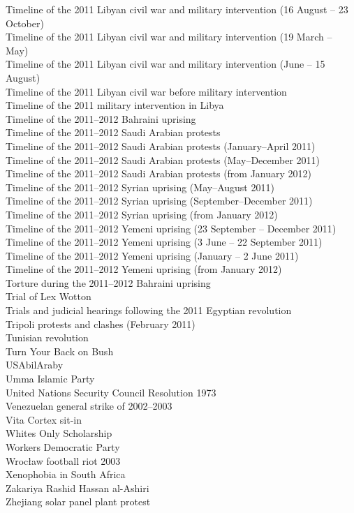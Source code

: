 Timeline of the 2011 Libyan civil war and military intervention (16 August – 23 October)\\
Timeline of the 2011 Libyan civil war and military intervention (19 March – May)\\
Timeline of the 2011 Libyan civil war and military intervention (June – 15 August)\\
Timeline of the 2011 Libyan civil war before military intervention\\
Timeline of the 2011 military intervention in Libya\\
Timeline of the 2011–2012 Bahraini uprising\\
Timeline of the 2011–2012 Saudi Arabian protests\\
Timeline of the 2011–2012 Saudi Arabian protests (January–April 2011)\\
Timeline of the 2011–2012 Saudi Arabian protests (May–December 2011)\\
Timeline of the 2011–2012 Saudi Arabian protests (from January 2012)\\
Timeline of the 2011–2012 Syrian uprising (May–August 2011)\\
Timeline of the 2011–2012 Syrian uprising (September–December 2011)\\
Timeline of the 2011–2012 Syrian uprising (from January 2012)\\
Timeline of the 2011–2012 Yemeni uprising (23 September – December 2011)\\
Timeline of the 2011–2012 Yemeni uprising (3 June – 22 September 2011)\\
Timeline of the 2011–2012 Yemeni uprising (January – 2 June 2011)\\
Timeline of the 2011–2012 Yemeni uprising (from January 2012)\\
Torture during the 2011–2012 Bahraini uprising\\
Trial of Lex Wotton\\
Trials and judicial hearings following the 2011 Egyptian revolution\\
Tripoli protests and clashes (February 2011)\\
Tunisian revolution\\
Turn Your Back on Bush\\
USAbilAraby\\
Umma Islamic Party\\
United Nations Security Council Resolution 1973\\
Venezuelan general strike of 2002–2003\\
Vita Cortex sit-in\\
Whites Only Scholarship\\
Workers Democratic Party\\
Wrocław football riot 2003\\
Xenophobia in South Africa\\
Zakariya Rashid Hassan al-Ashiri\\
Zhejiang solar panel plant protest